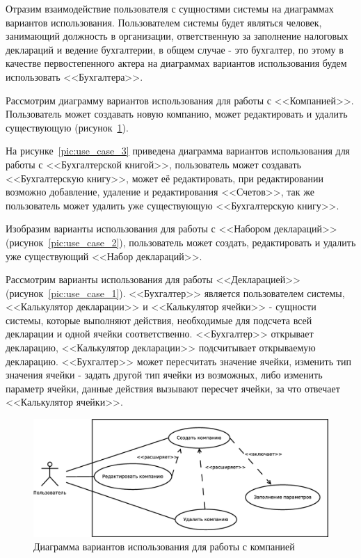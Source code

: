 \documentclass[14pt,a4paper]{reportmod}
\begin{document}
Отразим взаимодействие пользователя с сущностями системы на диаграммах вариантов использования. Пользователем системы будет являться человек, занимающий должность в организации, ответственную за заполнение налоговых деклараций и ведение бухгалтерии, в общем случае - это бухгалтер, по этому в качестве первостепенного актера на диаграммах вариантов использования будем использовать <<Бухгалтера>>.

Рассмотрим диаграмму вариантов использования для работы с <<Компанией>>. Пользователь может создавать новую компанию, может редактировать и удалить существующую (рисунок~\ref{pic:use_case_4}).

На рисунке~\ref{pic:use_case_3} приведена диаграмма вариантов использования для работы с <<Бухгалтерской книгой>>, пользователь может создавать <<Бухгалтерскую книгу>>, может её редактировать, при редактировании возможно добавление, удаление и редактирования <<Счетов>>, так же пользователь может удалить уже существующую <<Бухгалтерскую книгу>>.

Изобразим варианты использования для работы с <<Набором деклараций>> (рисунок~\ref{pic:use_case_2}), пользователь может создать, редактировать и удалить уже существующий <<Набор деклараций>>.

Рассмотрим варианты использования для работы <<Декларацией>> (рисунок~\ref{pic:use_case_1}). <<Бухгалтер>> является пользователем системы, <<Калькулятор декларации>> и <<Калькулятор ячейки>> - сущности системы, которые выполняют действия, необходимые для подсчета всей декларации и одной ячейки соответственно. <<Бухгалтер>> открывает декларацию, <<Калькулятор декларации>> подсчитывает открываемую декларацию. <<Бухгалтер>> может пересчитать значение ячейки, изменить тип значения ячейки - задать другой тип ячейки из возможных, либо изменить параметр ячейки, данные действия вызывают пересчет ячейки, за что отвечает <<Калькулятор ячейки>>.

\begin{figure}
  \centering
  \includegraphics[scale=0.4]{uml/usecase_4}
  \caption{Диаграмма вариантов использования для работы с компанией}
  \label{pic:use_case_4}
\end{figure}
\end{document}
